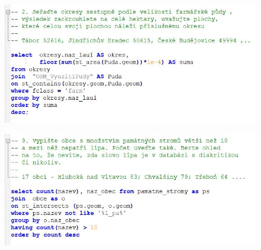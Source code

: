 \documentclass[a4paper, 12pt]{article}
\begin{document}
\begin{figure}[h!]
	\centering
	\includegraphics[width=15cm]{pictures/pd1.jpg}
\end{figure}

\begin{figure}[h!]
	\centering
	\includegraphics[width=15cm]{pictures/pd3.jpg}
\end{figure}

\clearpage
\end{document}
